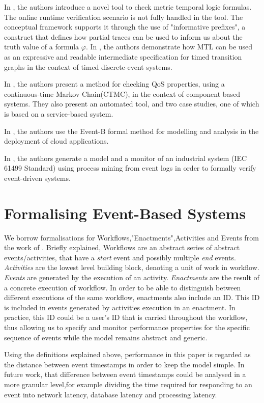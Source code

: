 \documentclass[twocolumn]{article}
\begin{document}
In \cite{hendriks_checking_2016}, the authors introduce a novel tool to check metric temporal logic formulas. The online runtime verification scenario is not fully handled in the tool.
The conceptual framework supports it through the use of "informative prefixes", a construct that defines how partial traces can be used to inform us about the truth value of a formula $\varphi$.
In \cite{dhananjayan_metric_2014}, the authors demonstrate how MTL can be used as an expressive and readable intermediate specification for timed transition graphs in the context of timed discrete-event systems.

In \cite{paterson_observation-enhanced_2018}, the authors present a method for checking QoS properties, using a continuous-time Markov Chain(CTMC), in the context of component based systems. They also present an automated tool, and two case studies, one of which is based on a service-based system.

In \cite{mammar_formal_2024}, the authors use the Event-B formal method for modelling and analysis in the deployment of cloud applications.

In \cite{xavier_framework_2024}, the authors generate a model and a monitor of an industrial system ({IEC 61499 Standard}) using process mining from event logs in order to formally verify event-driven systems.


\section{Formalising Event-Based Systems}
We borrow formalisations for Workflows,"Enactments",Activities and Events from the work of \cite{mackey_early_2024}. Briefly explained, Workflows are an abstract series of abstract events/activities, that have a {\it start} event and possibly multiple {\it end} events.
\emph{Activities} are the lowest level building block, denoting a unit of work in workflow.
\emph{Events} are generated by the execution of an activity.
\emph{Enactments} are the result of a concrete execution of workflow. In order to be able to distinguish between different executions of the same workflow, enactments also include an ID.
This ID is included in events generated by activities execution in an enactment. In practice, this ID could be a user's ID that is carried throughout the workflow, thus allowing us to specify and monitor performance properties for the specific sequence of events while the model remains abstract and generic.

\par
Using the definitions explained above, performance in this paper is regarded as the distance between event timestamps
in order to keep the model simple.
In future work, that difference between event timestamps could be analysed in a more granular level,for example dividing the time required for responding to an event into network latency, database latency and processing latency.
\end{document}
